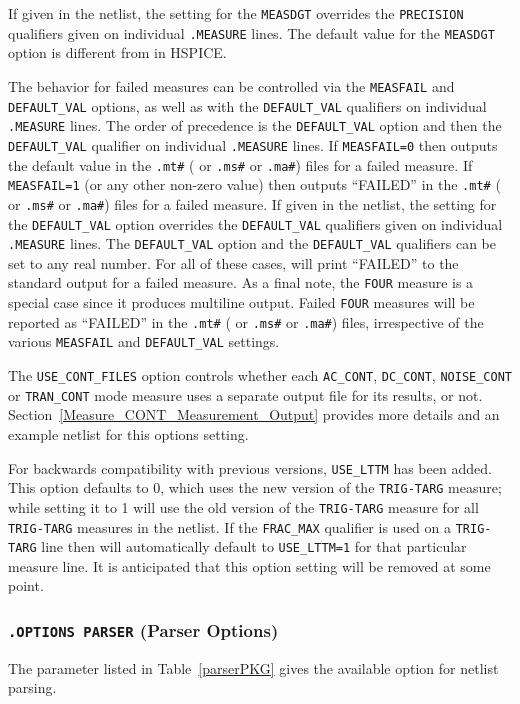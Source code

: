 If given in the netlist, the setting for the \texttt{MEASDGT} overrides the 
\texttt{PRECISION} qualifiers given on individual \texttt{.MEASURE} lines. 
The default value for the \texttt{MEASDGT} option is different from in HSPICE.

The \Xyce{} behavior for failed measures can be controlled via the \texttt{MEASFAIL}
and \texttt{DEFAULT\_VAL} options, as well as with the \texttt{DEFAULT\_VAL} 
qualifiers on individual \texttt{.MEASURE} lines.  The order of precedence is
the \texttt{DEFAULT\_VAL} option and then the \texttt{DEFAULT\_VAL} qualifier on
individual \texttt{.MEASURE} lines.  If \texttt{MEASFAIL=0} then \Xyce{} outputs
the default value in the \texttt{.mt\#} ( or \texttt{.ms\#} or \texttt{.ma\#})
files for a failed measure.  If \texttt{MEASFAIL=1} (or any other non-zero 
value) then \Xyce{} outputs ``FAILED'' in the \texttt{.mt\#} ( or \texttt{.ms\#} or \texttt{.ma\#}) 
files for a failed measure.  If given in the netlist, the setting for the 
\texttt{DEFAULT\_VAL} option overrides the \texttt{DEFAULT\_VAL} qualifiers given 
on individual \texttt{.MEASURE} lines.  The \texttt{DEFAULT\_VAL} option and the 
\texttt{DEFAULT\_VAL} qualifiers can be set to any real number.  For all of these 
cases, \Xyce{} will print ``FAILED'' to the standard output for a failed measure.
As a final note, the \texttt{FOUR} measure is a special case since it produces multiline
output.  Failed \texttt{FOUR} measures will be reported as ``FAILED'' in the
\texttt{.mt\#} ( or \texttt{.ms\#} or \texttt{.ma\#}) files, irrespective of the various
\texttt{MEASFAIL} and \texttt{DEFAULT\_VAL} settings.

The \texttt{USE\_CONT\_FILES} option controls whether each \texttt{AC\_CONT},
\texttt{DC\_CONT}, \texttt{NOISE\_CONT} or \texttt{TRAN\_CONT} mode measure uses
a separate output file for its results, or not. Section~\ref{Measure_CONT_Measurement_Output}
provides more details and an example netlist for this options setting.

For backwards compatibility with previous \Xyce{} versions, \texttt{USE\_LTTM} has
been added.  This option defaults to 0, which uses the new version of the \texttt{TRIG-TARG}
measure; while setting it to 1 will use the old version of the \texttt{TRIG-TARG} measure
for all \texttt{TRIG-TARG} measures in the netlist.  If the \texttt{FRAC\_MAX} qualifier
is used on a \texttt{TRIG-TARG} line then \Xyce{} will automatically default to
\texttt{USE\_LTTM=1} for that particular measure line.  It is anticipated that this
option setting will be removed at some point.



\subsubsection{\texttt{.OPTIONS PARSER} (Parser Options)}
The parameter listed in Table~\ref{parserPKG} gives the available
option for netlist parsing.




